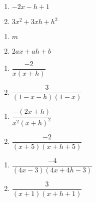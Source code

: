 \begin{multicols}{2}
\begin{enumerate}
\setcounter{enumi}{\value{HW}}

\item $-2x-h+1$
\item $3x^{2} + 3xh + h^{2}$

\setcounter{HW}{\value{enumi}}
\end{enumerate}
\end{multicols}

\begin{multicols}{2}
\begin{enumerate}
\setcounter{enumi}{\value{HW}}

\item $m$
\item $2ax + ah + b$

\setcounter{HW}{\value{enumi}}
\end{enumerate}
\end{multicols}


\begin{multicols}{2}
\begin{enumerate}
\setcounter{enumi}{\value{HW}}

\item $\dfrac{-2}{x(x+h)}$
\item $\dfrac{3}{(1-x-h)(1-x)}$

\setcounter{HW}{\value{enumi}}
\end{enumerate}
\end{multicols}

\begin{multicols}{2}
\begin{enumerate}
\setcounter{enumi}{\value{HW}}

\item  $\dfrac{-(2x+h)}{x^2(x+h)^2}$
\item  $\dfrac{-2}{(x+5)(x+h+5)}$

\setcounter{HW}{\value{enumi}}
\end{enumerate}
\end{multicols}

\begin{multicols}{2}
\begin{enumerate}
\setcounter{enumi}{\value{HW}}

\item $\dfrac{-4}{(4x-3)(4x+4h-3)}$
\item $\dfrac{3}{(x+1)(x+h+1)}$

\setcounter{HW}{\value{enumi}}
\end{enumerate}
\end{multicols}

